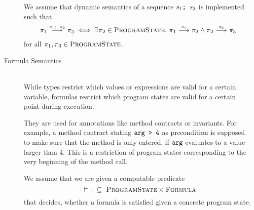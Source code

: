\begin{description}
    We assume that dynamic semantics of a sequence $\textup{\texttt{{$s_1$};~{$s_2$}}}$ is implemented such that 
    \begin{align}
    \label{frm:assume-seq-ss}
    \sstepConsume{\sSeq{$s_1$}{$s_2$}}{\pi_1}{\pi_3} \iff \exists \pi_2 \in \setProgramState.~ \sstepConsume{s_1}{\pi_1}{\pi_2} \wedge \sstepConsume{s_2}{\pi_2}{\pi_3}
    \end{align}
    for all $\pi_1, \pi_3 \in \textup{\textsc{ProgramState}}$.
    
    
    \begin{comment}
    Optionally, there may be a subset $~\setProgramStateEx \subseteq \setProgramStateFin~$ of states indicating exceptional termination of the program.
    To simplify reasoning about exceptional states, we assume $$\forall \pi_X \in \setProgramStateEx, \phi \in \setFormula.~ \evalphiGen{\pi_X}{\phi}$$ and something with special statement set?
    
    
    \end{comment}
    
\item[Formula Semantics]~\\
    While types restrict which values or expressions are valid for a certain variable,
    formulas restrict which program states are valid for a certain point during execution. 

    They are used for annotations like method contracts or invariants.
    For example, a method contract stating $\textup{\texttt{arg > 4}}$ as precondition is supposed to make sure that the method is only entered, if $\textup{\texttt{arg}}$ evaluates to a value larger than $4$.
    This is a restriction of program states corresponding to the very beginning of the method call.
    
    We assume that we are given a computable predicate
    \begin{displaymath}
    \cdot \,\,{\vDash}\,\, \cdot ~\subseteq~ \textup{\textsc{ProgramState}} \times \textup{\textsc{Formula}}
    \end{displaymath}
    that decides, whether a formula is satisfied given a concrete program state.
    

\end{description}
